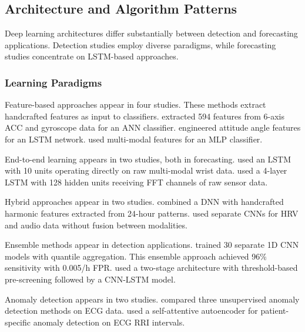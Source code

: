 \subsection{Architecture and Algorithm Patterns}

Deep learning architectures differ substantially between detection and forecasting applications. Detection studies employ diverse paradigms, while forecasting studies concentrate on LSTM-based approaches.

\subsubsection{Learning Paradigms}

Feature-based approaches appear in four studies. These methods extract handcrafted features as input to classifiers. \textcite{fineWearableDeviceSeizure2025} extracted 594 features from 6-axis ACC and gyroscope data for an ANN classifier. \textcite{wangDevelopmentWearableSeizure2025} engineered attitude angle features for an LSTM network. \textcite{singhRathoreWearableBasedEpileptic2024} used multi-modal features for an MLP classifier.

End-to-end learning appears in two studies, both in forecasting. \textcite{meiselMachineLearningWristband2020} used an LSTM with 10 units operating directly on raw multi-modal wrist data. \textcite{nasseriAmbulatorySeizureForecasting2021} used a 4-layer LSTM with 128 hidden units receiving FFT channels of raw sensor data.

Hybrid approaches appear in two studies. \textcite{vielufSeizureMonitoringCombined2025} combined a DNN with handcrafted harmonic features extracted from 24-hour patterns. \textcite{elemamAutomatedValidatedTool2025} used separate CNNs for HRV and audio data without fusion between modalities.

Ensemble methods appear in detection applications. \textcite{spahrDeepLearningbasedDetection2025} trained 30 separate 1D CNN models with quantile aggregation. This ensemble approach achieved 96\% sensitivity with 0.005/h FPR. \textcite{dongTwoLayerEnsembleMethod2022} used a two-stage architecture with threshold-based pre-screening followed by a CNN-LSTM model.

Anomaly detection appears in two studies. \textcite{reintjesECGBasedDetectionEpileptic2025} compared three unsupervised anomaly detection methods on ECG data. \textcite{odeDevelopmentEpilepticSeizure2023} used a self-attentive autoencoder for patient-specific anomaly detection on ECG RRI intervals.

